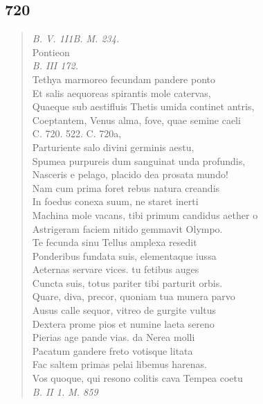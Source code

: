 \documentclass[11pt, a4paper]{report}
\begin{document}
            \subsection*{720}
      \begin{verse}
      \textit{B. V. 1I1B. M. 234.} \\ Pontieon \\ \textit{B. III 172.} \\ Tethya marmoreo fecundam pandere ponto \\ Et salis aequoreas spirantis mole catervas, \\ Quaeque sub aestifluis Thetis umida continet antris, \\ Coeptantem, Venus alma, fove, quae semine caeli \\ 
        ﻿\pagebreak 
    C. 720. 522. C. 720a, \\ Parturiente salo divini germinis aestu, \\ Spumea purpureis dum sanguinat unda profundis, \\ Nasceris e pelago, placido dea prosata mundo! \\ Nam cum prima foret rebus natura creandis \\ In foedus conexa suum, ne staret inerti \\ Machina mole vacans, tibi primum candidus aether o \\ Astrigeram faciem nitido gemmavit Olympo. \\ Te fecunda sinu Tellus amplexa resedit \\ Ponderibus fundata suis, elementaque iussa \\ Aeternas servare vices. tu fetibus auges \\ Cuncta suis, totus pariter tibi parturit orbis. \\ Quare, diva, precor, quoniam tua munera parvo \\ Ausus calle sequor, vitreo de gurgite vultus \\ Dextera prome pios et numine laeta sereno \\ Pierias age pande vias. da Nerea molli \\ Pacatum gandere freto votisque litata \\ Fac saltem primas pelai libemus harenas. \\ Vos quoque, qui resono colitis cava Tempea coetu \\ \textit{B. II 1. M. 859} \\ 
      \end{verse}
  
\end{document}
